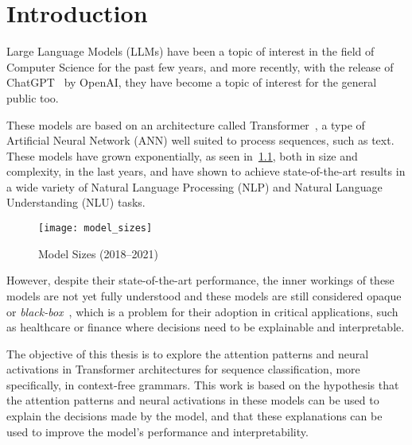 \chapter{Introduction}

Large Language Models (LLMs) have been a topic of interest in the field of Computer Science for the past few years, 
and more recently, with the release of ChatGPT~\cite{chatgpt} by OpenAI, they have become a topic of interest for the general public too.

These models are based on an architecture called Transformer~\cite{attention_is_all_you_need}, a type of Artificial Neural Network (ANN) 
well suited to process sequences, such as text. These models have grown exponentially, as seen in~\ref{fig:model_sizes}, both in size and complexity, in the last years, and 
have shown to achieve state-of-the-art results in a wide variety of Natural Language Processing (NLP) and Natural Language Understanding (NLU) tasks.

\begin{figure}[H]
    \centering
    \texttt{[image: model\_sizes]}
    \caption{Model Sizes (2018--2021)~\cite{model_sizes}}
    \label{fig:model_sizes}
\end{figure}

However, despite their state-of-the-art performance, the inner workings of these models are not yet fully understood and these models are still considered opaque or \emph{black-box}~\cite{lei-etal-2016-rationalizing}, which is a problem for their adoption in critical applications, such as healthcare or finance 
where decisions need to be explainable and interpretable. 

The objective of this thesis is to explore the attention patterns and neural activations in Transformer architectures for sequence classification, more specifically, in context-free grammars.
This work is based on the hypothesis that the attention patterns and neural activations in these models can be used to explain the decisions made by the model, and that these explanations can be used to improve the model's performance and interpretability.